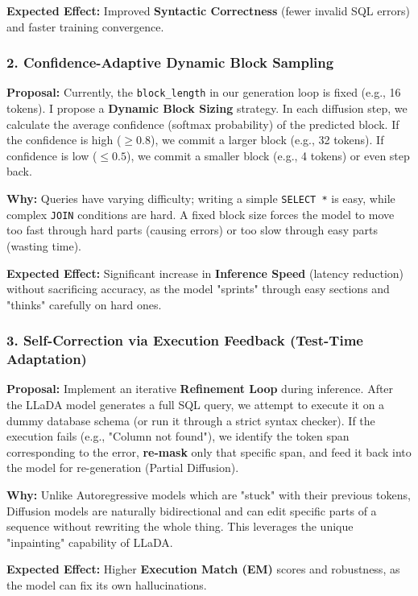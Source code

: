 \documentclass[a4paper,12pt]{article}
\begin{document}
\textbf{Expected Effect:} Improved \textbf{Syntactic Correctness} (fewer invalid SQL errors) and faster training convergence.

\subsubsection*{2. Confidence-Adaptive Dynamic Block Sampling}

\textbf{Proposal:} Currently, the \texttt{block\_length} in our generation loop is fixed (e.g., 16 tokens). I propose a \textbf{Dynamic Block Sizing} strategy. In each diffusion step, we calculate the average confidence (softmax probability) of the predicted block. If the confidence is high ($\geq 0.8$), we commit a larger block (e.g., 32 tokens). If confidence is low ($\leq 0.5$), we commit a smaller block (e.g., 4 tokens) or even step back.

\textbf{Why:} Queries have varying difficulty; writing a simple \texttt{SELECT *} is easy, while complex \texttt{JOIN} conditions are hard. A fixed block size forces the model to move too fast through hard parts (causing errors) or too slow through easy parts (wasting time).

\textbf{Expected Effect:} Significant increase in \textbf{Inference Speed} (latency reduction) without sacrificing accuracy, as the model "sprints" through easy sections and "thinks" carefully on hard ones.

\subsubsection*{3. Self-Correction via Execution Feedback (Test-Time Adaptation)}

\textbf{Proposal:} Implement an iterative \textbf{Refinement Loop} during inference. After the LLaDA model generates a full SQL query, we attempt to execute it on a dummy database schema (or run it through a strict syntax checker). If the execution fails (e.g., "Column not found"), we identify the token span corresponding to the error, \textbf{re-mask} only that specific span, and feed it back into the model for re-generation (Partial Diffusion).

\textbf{Why:} Unlike Autoregressive models which are "stuck" with their previous tokens, Diffusion models are naturally bidirectional and can edit specific parts of a sequence without rewriting the whole thing. This leverages the unique "inpainting" capability of LLaDA.

\textbf{Expected Effect:} Higher \textbf{Execution Match (EM)} scores and robustness, as the model can fix its own hallucinations.
\end{document}
